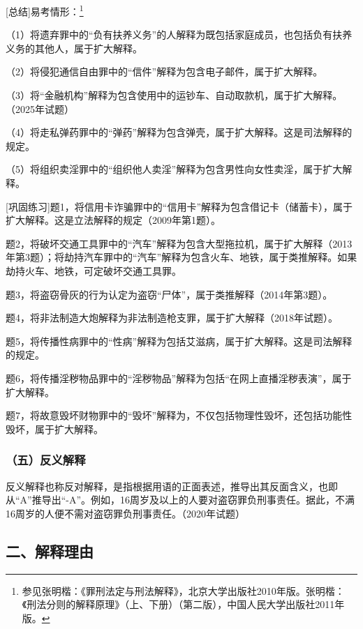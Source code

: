 
[总结]易考情形：\footnote{参见张明楷：《罪刑法定与刑法解释》，北京大学出版社2010年版。张明楷：《刑法分则的解释原理》（上、下册）（第二版），中国人民大学出版社2011年版。}

（1）将遗弃罪中的“负有扶养义务”的人解释为既包括家庭成员，也包括负有扶养义务的其他人，属于扩大解释。

（2）将侵犯通信自由罪中的“信件”解释为包含电子邮件，属于扩大解释。

（3）将“金融机构”解释为包含使用中的运钞车、自动取款机，属于扩大解释。（2025年试题）

（4）将走私弹药罪中的“弹药”解释为包含弹壳，属于扩大解释。这是司法解释的规定。

（5）将组织卖淫罪中的“组织他人卖淫”解释为包含男性向女性卖淫，属于扩大解释。

[巩固练习]题1，将信用卡诈骗罪中的“信用卡”解释为包含借记卡（储蓄卡），属于扩大解释。这是立法解释的规定（2009年第1题）。

题2，将破坏交通工具罪中的“汽车”解释为包含大型拖拉机，属于扩大解释（2013年第3题）；将劫持汽车罪中的“汽车”解释为包含火车、地铁，属于类推解释。如果劫持火车、地铁，可定破坏交通工具罪。

题3，将盗窃骨灰的行为认定为盗窃“尸体”，属于类推解释（2014年第3题）。

题4，将非法制造大炮解释为非法制造枪支罪，属于扩大解释（2018年试题）。

题5，将传播性病罪中的“性病”解释为包括艾滋病，属于扩大解释。这是司法解释的规定。

题6，将传播淫秽物品罪中的“淫秽物品”解释为包括“在网上直播淫秽表演”，属于扩大解释。

题7，将故意毁坏财物罪中的“毁坏”解释为，不仅包括物理性毁坏，还包括功能性毁坏，属于扩大解释。

\subsubsection*{（五）反义解释}

反义解释也称反对解释，是指根据用语的正面表述，推导出其反面含义，也即从“A”推导出“-A”。例如，16周岁及以上的人要对盗窃罪负刑事责任。据此，不满16周岁的人便不需对盗窃罪负刑事责任。（2020年试题）

\subsection*{二、解释理由}

